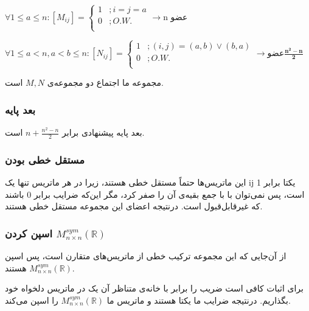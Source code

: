\setLTR
$
\forall
1\leq a	\leq n : [M_{ij}]=\begin{cases}
	1 & ;  i = j =a \\
	0 & ;  O.W. \\
\end{cases} \longrightarrow \text{n عضو}
$

$
\forall 1\leq a < n , a < b \leq n: [N_{ij}]=\begin{cases}
	1 & ; (i,j)=(a,b)\lor(b,a) \\
	0 & ; O.W.\\
\end{cases} \longrightarrow \text{عضو} \boldsymbol{\frac{n^2-n}{2}}
$
\setRTL

مجموعه ما اجتماع دو مجموعه‌ی
$M , N$
است.

\subsubsection*{بعد پایه}

بعد پایه پیشنهادی برابر 
$n + \frac{n^2-n}{2}$
است.

\subsubsection*{مستقل خطی بودن}

این ماتریس‌ها حتماً مستقل خطی هستند، زیرا در هر ماتریس تنها یک ij یکتا برابر 1 است، پس نمی‌توان با با جمع بقیه‌ی آن را صفر کرد، مگر این‌که ضرایب برابر 0 باشند که غیرقابل‌قبول است. درنتیجه اعضای این مجموعه مستقل خطی هستند.

\subsubsection*{اسپن کردن $M^{sym}_{n \times n}(\mathbb{R})$} 

از آن‌جایی که این مجموعه ترکیب خطی از ماتریس‌های متقارن است، پس اسپن 
$M^{sym}_{n \times n}(\mathbb{R})$
هستند.

برای اثبات کافی است ضریب را برابر با خانه‌ی متناظر آن یک در ماتریس دلخواه خود بگذاریم. درنتیجه ضرایب ما یکتا هستند و ماتریس ما
$M^{sym}_{n \times n}(\mathbb{R})$
را اسپن می‌کند.












